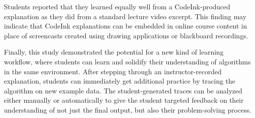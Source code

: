 Students reported that they learned equally well from a CodeInk-produced
explanation as they did from a standard lecture video excerpt. This
finding may indicate that CodeInk explanations can be embedded in online
course content in place of screencasts created using drawing
applications or blackboard recordings.

Finally, this study demonstrated the potential for a new kind of
learning workflow, where students can learn and solidify their
understanding of algorithms in the same environment. After
stepping through an instructor-recorded explanation, students can
immediately get additional practice by tracing the algorithm on new
example data. The student-generated traces can be analyzed either
manually or automatically to give the student targeted feedback on their
understanding of not just the final output, but also their
problem-solving process.

